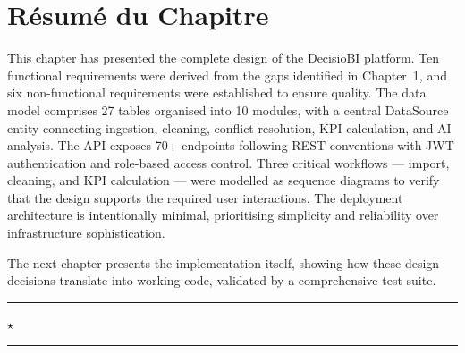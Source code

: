 \section{Résumé du Chapitre}

\noindent
This chapter has presented the complete design
of the DecisioBI platform.
Ten functional requirements were derived from the gaps
identified in Chapter~1,
and six non-functional requirements
were established to ensure quality.
The data model comprises 27 tables
organised into 10 modules,
with a central DataSource entity
connecting ingestion, cleaning, conflict resolution,
KPI calculation, and AI analysis.
The API exposes 70+ endpoints
following REST conventions with JWT authentication
and role-based access control.
Three critical workflows — import, cleaning,
and KPI calculation — were modelled as sequence diagrams
to verify that the design supports
the required user interactions.
The deployment architecture is intentionally minimal,
prioritising simplicity and reliability
over infrastructure sophistication.

\vspace{0.4cm}
\noindent
The next chapter presents the implementation itself,
showing how these design decisions
translate into working code,
validated by a comprehensive test suite.

\vspace{0.7cm}
\begin{center}
  \textcolor{BITred!40}{\rule{0.35\linewidth}{0.5pt}}
  \hspace{0.5em}
  \textcolor{BITred}{$\star$}
  \hspace{0.5em}
  \textcolor{BITred!40}{\rule{0.35\linewidth}{0.5pt}}
\end{center}
